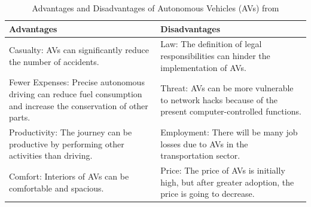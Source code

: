 \begin{table}[ht]
    \centering
    \begin{tabular}{|l|l|}
        \hline
        \textbf{Advantages} & \textbf{Disadvantages} \\ \hline
        Casualty: AVs can significantly reduce the number of accidents. & Law: The definition of legal responsibilities can hinder the implementation of AVs. \\ \hline
        Fewer Expenses: Precise autonomous driving can reduce fuel consumption and increase the conservation of other parts. & Threat: AVs can be more vulnerable to network hacks because of the present computer-controlled functions. \\ \hline
        Productivity: The journey can be productive by performing other activities than driving. & Employment: There will be many job losses due to AVs in the transportation sector. \\ \hline
        Comfort: Interiors of AVs can be comfortable and spacious. & Price: The price of AVs is initially high, but after greater adoption, the price is going to decrease. \\ \hline
    \end{tabular}
    \caption{Advantages and Disadvantages of Autonomous Vehicles (AVs) from \cite{ahangar2021survey} }\label{tab:table}
\end{table}

